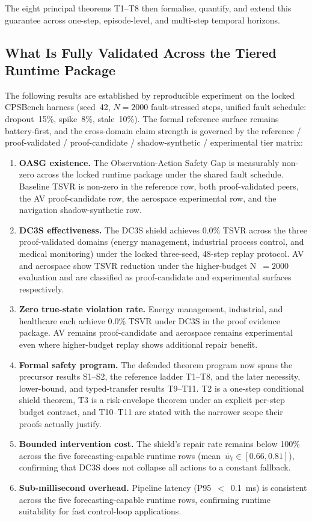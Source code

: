 The eight principal theorems T1--T8 then formalise, quantify, and
extend this guarantee across one-step, episode-level, and multi-step
temporal horizons.

\subsection{What Is Fully Validated Across the Tiered Runtime Package}

The following results are established by reproducible experiment on the locked
CPSBench harness (seed~42, $N = 2000$ fault-stressed steps, unified fault schedule:
dropout~15\%, spike~8\%, stale~10\%).  The formal reference surface remains
battery-first, and the cross-domain claim strength is governed by the
reference / proof-validated / proof-candidate / shadow-synthetic /
experimental tier matrix:

\begin{enumerate}
  \item \textbf{OASG existence.}  The Observation-Action Safety Gap is
    measurably non-zero across the locked runtime package under the shared
    fault schedule.  Baseline TSVR is non-zero in the reference row, both
    proof-validated peers, the AV proof-candidate row, the aerospace
    experimental row, and the navigation shadow-synthetic row.
  \item \textbf{DC3S effectiveness.}  The DC3S shield achieves
    0.0\% TSVR across the three proof-validated domains (energy management,
    industrial process control, and medical monitoring) under the locked
    three-seed, 48-step replay protocol.  AV and aerospace show TSVR
    reduction under the higher-budget N~$= 2000$ evaluation and are
    classified as proof-candidate and experimental surfaces respectively.
  \item \textbf{Zero true-state violation rate.}  Energy management,
    industrial, and healthcare each achieve 0.0\% TSVR under DC3S in the
    proof evidence package.  AV remains proof-candidate and aerospace
    remains experimental even where higher-budget replay shows additional
    repair benefit.
  \item \textbf{Formal safety program.}  The defended theorem program now
    spans the precursor results S1--S2, the reference ladder T1--T8, and the
    later necessity, lower-bound, and typed-transfer results T9--T11.  T2 is
    a one-step conditional shield theorem, T3 is a risk-envelope theorem
    under an explicit per-step budget contract, and T10--T11 are stated with
    the narrower scope their proofs actually justify.
  \item \textbf{Bounded intervention cost.}  The shield's repair rate remains
    below 100\% across the five forecasting-capable runtime rows (mean~$\bar{w}_t \in
    [0.66, 0.81]$), confirming that DC3S does not collapse all actions to a
    constant fallback.
  \item \textbf{Sub-millisecond overhead.}  Pipeline latency (P95~$<$~0.1~ms)
    is consistent across the five forecasting-capable runtime rows, confirming runtime
    suitability for fast control-loop applications.
\end{enumerate}

